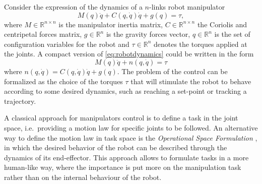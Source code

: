Consider the expression of the dynamics of a $n$-links robot manipulator
\begin{equation}
M(q)\ddot{q} + C(q,\dot{q})\dot{q} + g(q) = \tau,
\label{eq:robotdynamics}
\end{equation}
where $M\in\mathbb{R}^{n \times n}$ is the manipulator inertia matrix, $C\in\mathbb{R}^{n \times n}$ the Coriolis and centripetal forces matrix, $g\in\mathbb{R}^n$ is the gravity forces vector, $q\in\mathbb{R}^n$ is the set of configuration variables for the robot and $\tau\in\mathbb{R}^n$ denotes the torques applied at the joints. A compact version of \eqref{eq:robotdynamics} could be written in the form
\begin{equation}
M(q)\ddot{q} + n(q,\dot{q}) = \tau
\label{eq:compactrobotdynamics}
\end{equation}
where $n(q,\dot{q}) = C(q,\dot{q})\dot{q} + g(q)$. The problem of the control can be formalized as the choice of the torques $ \tau $ that will stimulate the robot to behave according to some desired dynamics, such as reaching a set-point or tracking a trajectory.

A classical approach for manipulators control is to define a task in the joint space, i.e.\ providing a motion law for specific joints to be followed. An alternative way to define the motion law in task space is the \textit{Operational Space Formulation} \cite{khatib87}, in which the desired behavior of the robot can be described through the dynamics of its end-effector. This approach allows to formulate tasks in a more human-like way, where the importance is put more on the manipulation task rather than on the internal behaviour of the robot.

